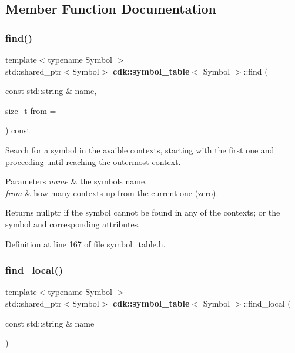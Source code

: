 \subsection{Member Function Documentation}
\mbox{\label{classcdk_1_1symbol__table_a0ba53541f7eefdad36bfc88097eb30f4}} 
\subsubsection{find()}
{\footnotesize\ttfamily template$<$typename Symbol $>$ \\
std\+::shared\+\_\+ptr$<$Symbol$>$ \textbf{ cdk\+::symbol\+\_\+table}$<$ Symbol $>$\+::find (\begin{DoxyParamCaption}\item[{const std\+::string \&}]{name,  }\item[{size\+\_\+t}]{from = {} }\end{DoxyParamCaption}) const\hspace{0.3cm}{\ttfamily [inline]}}

Search for a symbol in the avaible contexts, starting with the first one and proceeding until reaching the outermost context.


\begin{DoxyParams}{Parameters}
{\em name} & the symbol\textquotesingle{}s name. \\
\hline
{\em from} & how many contexts up from the current one (zero). \\
\hline
\end{DoxyParams}
\begin{DoxyReturn}{Returns}
{\ttfamily nullptr} if the symbol cannot be found in any of the contexts; or the symbol and corresponding attributes. 
\end{DoxyReturn}


Definition at line 167 of file symbol\+\_\+table.\+h.

\mbox{\label{classcdk_1_1symbol__table_a7b5a83e2dfef11c7c3ffef952267b012}} 
\subsubsection{find\+\_\+local()}
{\footnotesize\ttfamily template$<$typename Symbol $>$ \\
std\+::shared\+\_\+ptr$<$Symbol$>$ \textbf{ cdk\+::symbol\+\_\+table}$<$ Symbol $>$\+::find\+\_\+local (\begin{DoxyParamCaption}\item[{const std\+::string \&}]{name }\end{DoxyParamCaption})\hspace{0.3cm}{\ttfamily [inline]}}

